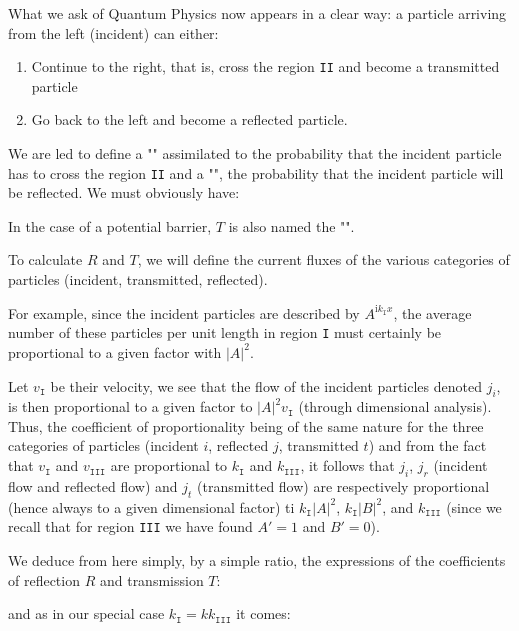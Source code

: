 	What we ask of Quantum Physics now appears in a clear way: a particle arriving from the left (incident) can either:
	\begin{enumerate}
		\item Continue to the right, that is, cross the region \texttt{II} and become a transmitted particle

		\item Go back to the left and become a reflected particle.
	\end{enumerate}
	We are led to define a ""  assimilated to the probability that the incident particle has to cross the region \texttt{II} and a "", the probability that the incident particle will be reflected. We must obviously have:
	
	In the case of a potential barrier, $T$ is also named the "".

	To calculate $R$ and $T$, we will define the current fluxes of the various categories of particles (incident, transmitted, reflected).
	
	For example, since the incident particles are described by $A^{\mathrm{i}k_\texttt{I}x}$, the average number of these particles per unit length in region \texttt{I} must certainly be proportional to a given factor with $|A|^2$.
	
	Let $v_{\texttt{I}}$ be their velocity, we see that the flow of the incident particles denoted $j_i$, is then proportional to a given factor to $|A|^2v_{\texttt{I}}$ (through dimensional analysis). Thus, the coefficient of proportionality being of the same nature for the three categories of particles (incident $i$, reflected $j$, transmitted $t$) and from the fact that $v_{\texttt{I}}$ and $v_{\texttt{III}}$ are proportional to $k_{\texttt{I}}$ and $k_{\texttt{III}}$, it follows that $j_i$, $j_r$ (incident flow and reflected flow) and $j_t$ (transmitted flow) are respectively proportional (hence always to a given dimensional factor) ti $k_{\texttt{I}}|A|^2$, $k_{\texttt{I}}|B|^2$, and $k_{\texttt{III}}$ (since we recall that for region \texttt{III} we have found $A'=1$ and $B'=0$).
	
	We deduce from here simply, by a simple ratio, the expressions of the coefficients of reflection $R$ and transmission $T$:
	
	and as in our special case $k_{\texttt{I}}=kk_{\texttt{III}}$ it comes:
	

